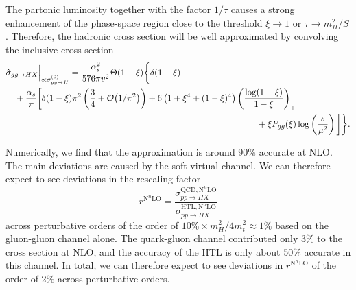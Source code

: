 The partonic luminosity together with the factor $1/\tau$ causes a strong enhancement of the phase-space region close to the threshold $\xi \rightarrow 1$ or $\tau \rightarrow m_H^2/S$. Therefore, the hadronic cross section will be well approximated by convolving the inclusive cross section
\begin{equation}
\begin{split}
& \hat{\sigma}_{gg \rightarrow HX} \Big \vert_{\propto \sigma_{gg \rightarrow H}^{(0)}} = \frac{\alphas^2}{576 \pi v^2} \Theta(1 - \xi) \bigg \lbrace \delta(1 - \xi) \\
& \quad + \frac{\alphas}{\pi} \bigg [ \delta(1 - \xi) \pi^2\left( \frac{3}{4} + \BigO{1/\pi^2} \right) + 6 \left( 1 + \xi^4 + (1 - \xi)^4 \right) \left(\frac{\log (1 - \xi)}{1 - \xi} \right)_+ \\
& \hspace{10cm} + \xi P_{gg}(\xi) \log \left(\frac{s}{\mu^2} \right) \bigg ] \bigg \rbrace.
\end{split}
\end{equation}

Numerically, we find that the approximation is around $90\%$ accurate at \acs{NLO}. The main deviations are caused by the soft-virtual channel. We can therefore expect to see deviations in the rescaling factor
\begin{equation}
r^{\mathrm{N}^n\mathrm{LO}} = \frac{\sigma_{pp \rightarrow HX}^{\mathrm{QCD}, \mathrm{N}^n \mathrm{LO}}}{\sigma_{pp \rightarrow HX}^{\mathrm{HTL}, \mathrm{N}^n \mathrm{LO}}}
\end{equation}
across perturbative orders of the order of $10\%\times m_H^2/4m_t^2 \approx 1\%$ based on the gluon-gluon channel alone. The quark-gluon channel contributed only 3\% to the cross section at \acs{NLO}, and the accuracy of the \acs{HTL} is only about 50\% accurate in this channel. In total, we can therefore expect to see deviations in $r^{\mathrm{N}^n\mathrm{LO}}$ of the order of 2\% across perturbative orders.

